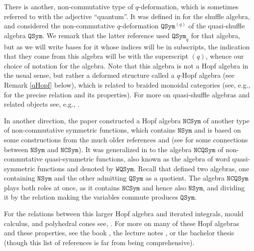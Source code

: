 \documentclass{article}
\theoremstyle{definition}
\begin{document}
There is another, non-commutative type of $q$-deformation, which is sometimes referred to with the adjective ``quantum''. It was defined in \cite{[DKKT]} for the shuffle algebra, and \cite{[TU]} considered the non-commutative $q$-deformation $\mathtt{QSym}^{(q)}$ of the quasi-shuffle algebra $\mathtt{QSym}$. We remark that the latter reference used $\mathtt{QSym}_{q}$ for that algebra, but as we will write bases for it whose indices will be in subscripts, the indication that they come from this algebra will be with the superscript $(q)$, whence our choice of notation for the algebra. Note that this algebra is not a Hopf algebra in the usual sense, but rather a deformed structure called a $q$-Hopf algebra (see Remark \ref{qHopf} below), which is related to braided monoidal categories (see, e.g., \cite{[AgM]} for the precise relation and its properties). For more on quasi-shuffle algebras and related objects see, e.g., \cite{[DEMT]}.

\medskip

In another direction, the paper \cite{[RS]} constructed a Hopf algebra $\mathtt{NCSym}$ of another type of non-commutative symmetric functions, which contains $\mathtt{NSym}$ and is based on some constructions from the much older references \cite{[W]} and \cite{[BC]} (see \cite{[BRRZ]} for some connections between $\mathtt{NSym}$ and $\mathtt{NCSym}$). It was generalized in \cite{[BZ]} to the algebra $\mathtt{NCQSym}$ of non-commutative quasi-symmetric functions, also known as the algebra of word quasi-symmetric functions and denoted by $\mathtt{WQSym}$. Recall that \cite{[MR]} defined two algebras, one containing $\mathtt{NSym}$ and the other admitting $\mathtt{QSym}$ as a quotient. The algebra $\mathtt{NCQSym}$ plays both roles at once, as it contains $\mathtt{NCSym}$ and hence also $\mathtt{NSym}$, and dividing it by the relation making the variables commute produces $\mathtt{QSym}$.

For the relations between this larger Hopf algebra and iterated integrals, mould calculus, and polyhedral cones see, \cite{[MNT]}. For more on many of these Hopf algebras and these properties, see the book \cite{[LMvW]}, the lecture notes \cite{[GR]}, or the bachelor thesis \cite{[D]} (though this list of references is far from being comprehensive). 

\medskip
\end{document}
